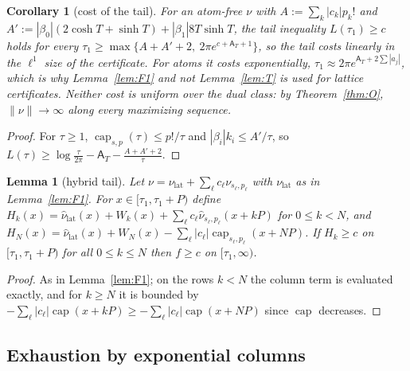 \documentclass[11pt]{amsart}
\newtheorem{lemma}[theorem]{Lemma}
\newtheorem{corollary}[theorem]{Corollary}
\theoremstyle{definition}
\theoremstyle{remark}
\newcommand{\nuh}{\widehat\nu}
\newcommand{\Aconst}{\mathsf A_T}
\begin{document}
\begin{corollary}[cost of the tail]\label{cor:T2}
For an atom-free $\nu$ with $A:=\sum_k|c_k|p_k!$ and $A':=|\beta_0|(2\cosh T+\sinh T)+|\beta_1|8T\sinh T$,
the tail inequality $L(\tau_1)\ge c$ holds for every $\tau_1\ge\max\{A+A'+2,\ 2\pi e^{c+\Aconst+1}\}$,
so the tail costs linearly in the $\ell^1$ size of the certificate. For atoms it costs
exponentially, $\tau_1\approx2\pi e^{\Aconst+2\sum|a_j|}$, which is why Lemma~\ref{lem:F1} and not
Lemma~\ref{lem:T} is used for lattice certificates. Neither cost is uniform over the dual class:
by Theorem~\ref{thm:O}, $\|\nu\|\to\infty$ along every maximizing sequence.
\end{corollary}
\begin{proof}
For $\tau\ge1$, $\operatorname{cap}_{s,p}(\tau)\le p!/\tau$ and $|\beta_i|k_i\le A'/\tau$, so
$L(\tau)\ge\log\frac\tau{2\pi}-\Aconst-\frac{A+A'+2}{\tau}$.
\end{proof}

\begin{lemma}[hybrid tail]\label{lem:hybrid}
Let $\nu=\nu_{\mathrm{lat}}+\sum_\ell c_\ell\nu_{s_\ell,p_\ell}$ with $\nu_{\mathrm{lat}}$ as in Lemma~\ref{lem:F1}.
For $x\in[\tau_1,\tau_1+P)$ define $H_k(x)=\nuh_{\mathrm{lat}}(x)+W_k(x)+\sum_\ell c_\ell\nuh_{s_\ell,p_\ell}(x+kP)$
for $0\le k<N$, and $H_N(x)=\nuh_{\mathrm{lat}}(x)+W_N(x)-\sum_\ell|c_\ell|\operatorname{cap}_{s_\ell,p_\ell}(x+NP)$.
If $H_k\ge c$ on $[\tau_1,\tau_1+P)$ for all $0\le k\le N$ then $f\ge c$ on $[\tau_1,\infty)$.
\end{lemma}
\begin{proof}
As in Lemma~\ref{lem:F1}; on the rows $k<N$ the column term is evaluated exactly, and for
$k\ge N$ it is bounded by $-\sum_\ell|c_\ell|\operatorname{cap}(x+kP)\ge-\sum_\ell|c_\ell|\operatorname{cap}(x+NP)$
since $\operatorname{cap}$ decreases.
\end{proof}

\subsection{Exhaustion by exponential columns}
\end{document}
